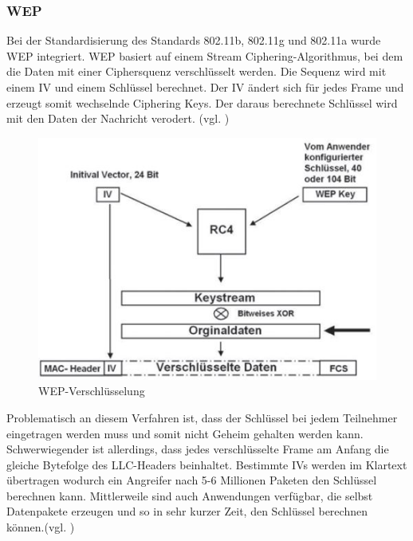 \subsubsection{\ac{WEP}}
Bei der Standardisierung des Standards 802.11b, 802.11g und 802.11a wurde \ac{WEP} integriert. \ac{WEP} basiert auf einem Stream Ciphering-Algorithmus, bei dem die Daten mit einer Ciphersquenz verschlüsselt werden. Die Sequenz wird mit einem \ac{IV} und einem Schlüssel berechnet. Der \ac{IV} ändert sich für jedes Frame und erzeugt somit wechselnde Ciphering Keys. Der daraus berechnete Schlüssel wird mit den Daten der Nachricht verodert. (vgl. \cite{SWB-430171331})


\begin{figure} [htb]
\begin{centering}
\includegraphics{Bilder/wep_funktionsweise.jpg}
\caption[WEP-Verschlüsselung]{WEP-Verschlüsselung \cite{SWB-430171331}}
\label{wep_funktionsweise}
\end{centering}
\end{figure}

Problematisch an diesem Verfahren ist, dass der Schlüssel bei jedem Teilnehmer eingetragen werden muss und somit nicht Geheim gehalten werden kann. Schwerwiegender ist allerdings, dass jedes verschlüsselte Frame am Anfang die gleiche Bytefolge des \ac{LLC}-Headers beinhaltet. Bestimmte \ac{IV}s werden im Klartext übertragen wodurch ein Angreifer nach 5-6 Millionen Paketen den Schlüssel berechnen kann. Mittlerweile sind auch Anwendungen verfügbar, die selbst Datenpakete erzeugen und so in sehr kurzer Zeit, den Schlüssel berechnen können.(vgl. \cite{SWB-430171331})

